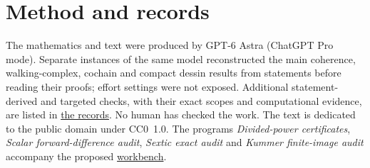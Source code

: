 \documentclass[11pt,a4paper]{article}
\theoremstyle{definition}
\newcommand{\recordurl}{https://github.com/KokunoYumeto/mathematics-workbenches}
\newcommand{\workbenchurl}{https://github.com/KokunoYumeto/homotopy-and-categories-workbench}
\begin{document}
\section*{Method and records}
The mathematics and text were produced by GPT-6 Astra (ChatGPT Pro mode).
Separate instances of the same model reconstructed the main coherence,
walking-complex, cochain and compact dessin results from statements
before reading their proofs; effort settings were not exposed.
Additional statement-derived and targeted checks, with their exact
scopes and computational evidence, are listed in
\href{\recordurl}{the records}. No human has checked the work.
The text is dedicated to the public domain under CC0~1.0.
The programs \emph{Divided-power certificates},
\emph{Scalar forward-difference audit}, \emph{Sextic exact audit}
and \emph{Kummer finite-image audit} accompany the proposed
\href{\workbenchurl}{workbench}.
\end{document}
